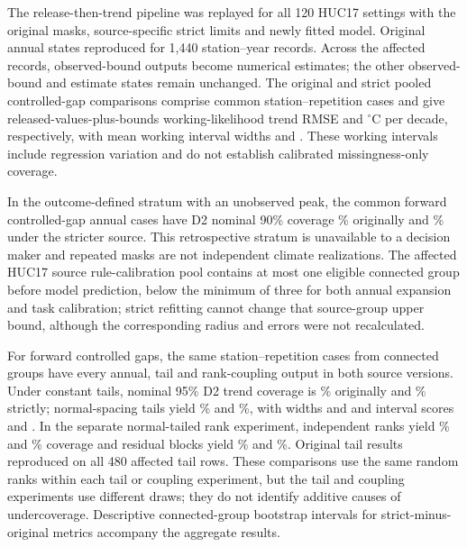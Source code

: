 The release-then-trend pipeline was replayed for all 120 HUC17 settings with the original masks, source-specific strict limits and newly fitted model. Original annual states reproduced for 1,440 station--year records. Across the affected records, \SRChangedStates{} observed-bound outputs become numerical estimates; the other observed-bound and estimate states remain unchanged. The original and strict pooled controlled-gap comparisons comprise \SRIntN{} common station--repetition cases and give released-values-plus-bounds working-likelihood trend RMSE \SRIntOld{} and \SRIntNew{} $^{\circ}$C per decade, respectively, with mean working interval widths \SRIntOldWidth{} and \SRIntNewWidth{}. These working intervals include regression variation and do not establish calibrated missingness-only coverage.

In the outcome-defined stratum with an unobserved peak, the \SRAnnualN{} common forward controlled-gap annual cases have D2 nominal 90\% coverage \SRAnnualOld\% originally and \SRAnnualNew\% under the stricter source. This retrospective stratum is unavailable to a decision maker and repeated masks are not independent climate realizations. The affected HUC17 source rule-calibration pool contains at most one eligible connected group before model prediction, below the minimum of three for both annual expansion and task calibration; strict refitting cannot change that source-group upper bound, although the corresponding radius and errors were not recalculated.

For forward controlled gaps, the same \SRUncN{} station--repetition cases from \SRUncGroups{} connected groups have every annual, tail and rank-coupling output in both source versions. Under constant tails, nominal 95\% D2 trend coverage is \SRConstOld\% originally and \SRConstNew\% strictly; normal-spacing tails yield \SRNormalOld\% and \SRNormalNew\%, with widths \SRNormalOldWidth{} and \SRNormalNewWidth{} and interval scores \SRNormalOldScore{} and \SRNormalNewScore{}. In the separate normal-tailed rank experiment, independent ranks yield \SRIndOld\% and \SRIndNew\% coverage and residual blocks yield \SRBlockOld\% and \SRBlockNew\%. Original tail results reproduced on all 480 affected tail rows. These comparisons use the same random ranks within each tail or coupling experiment, but the tail and coupling experiments use different draws; they do not identify additive causes of undercoverage. Descriptive connected-group bootstrap intervals for strict-minus-original metrics accompany the aggregate results.

